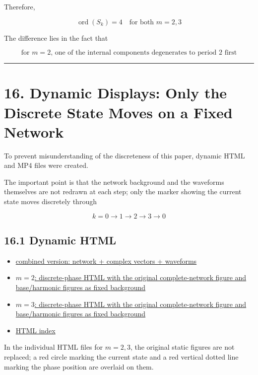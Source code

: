 \documentclass[
  a4paper,
]{article}
\providecommand{\tightlist}{%
  \setlength{\itemsep}{0pt}\setlength{\parskip}{0pt}}
\begin{document}
Therefore,

\[
\boxed{
\operatorname{ord}(S_k)=4
\quad\text{for both }m=2,3
}
\]

The difference lies in the fact that

\[
\boxed{
\text{for }m=2\text{, one of the internal components degenerates to period 2 first}
}
\]

\begin{center}\rule{0.5\linewidth}{0.5pt}\end{center}

\section{16. Dynamic Displays: Only the Discrete State Moves on a Fixed
Network}\label{dynamic-displays-only-the-discrete-state-moves-on-a-fixed-network}

To prevent misunderstanding of the discreteness of this paper, dynamic
HTML and MP4 files were created.

The important point is that the network background and the waveforms
themselves are not redrawn at each step; only the marker showing the
current state moves discretely through

\[
k=0\to1\to2\to3\to0
\]

\subsection{16.1 Dynamic HTML}\label{dynamic-html}

\begin{itemize}
\tightlist
\item
  \href{K4_harmonic_discrete_phase_animation_20260915.html}{combined
  version: network + complex vectors + waveforms}
\item
  \href{K4_network_wave_discrete_m2.html}{\(m=2\): discrete-phase HTML
  with the original complete-network figure and base/harmonic figures as
  fixed background}
\item
  \href{K4_network_wave_discrete_m3.html}{\(m=3\): discrete-phase HTML
  with the original complete-network figure and base/harmonic figures as
  fixed background}
\item
  \href{K4_network_wave_index.html}{HTML index}
\end{itemize}

In the individual HTML files for \(m=2,3\), the original static figures
are not replaced; a red circle marking the current state and a red
vertical dotted line marking the phase position are overlaid on them.
\end{document}
